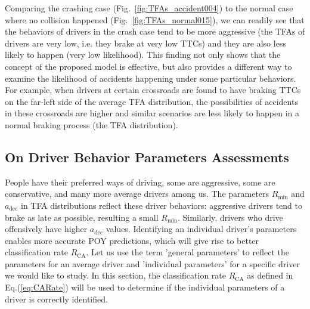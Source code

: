 Comparing the crashing case (Fig.~\ref{fig:TFAs_accident004}) to the normal case where no collision happened (Fig.~\ref{fig:TFAs_normal015}), we can readily see that the behaviors of drivers in the crash case tend to be more aggressive (the TFAs of drivers are very low, i.e. they brake at very low TTCs) and they are also less likely to happen (very low likelihood). This finding not only shows that the concept of the proposed model is effective, but also provides a different way to examine the likelihood of accidents happening under some particular behaviors. For example, when drivers at certain crossroads are found to have braking TTCs on the far-left side of the average TFA distribution, the possibilities of accidents in these crossroads are higher and similar scenarios are less likely to happen in a normal braking process (the TFA distribution).



\subsection{On Driver Behavior Parameters Assessments}
\label{subsec:CharaParam}

People have their preferred ways of driving, some are aggressive, some are conservative, and many more average drivers among us. The parameters $R_{\mathrm{min}}$ and $a_{\mathrm{dec}}$ in TFA distributions reflect these driver behaviors: aggressive drivers tend to brake as late as possible, resulting a small $R_{\mathrm{min}}$. Similarly, drivers who drive offensively have higher $a_{\mathrm{dec}}$ values. Identifying an individual driver's parameters enables more accurate POY predictions, which will give rise to better classification rate $R_{\mathrm{CA}}$. Let us use the term 'general parameters' to reflect the parameters for an average driver and 'individual parameters' for a specific driver we would like to study.  In this section, the classification rate $R_{\mathrm{CA}}$ as defined in Eq.(\ref{eq:CARate}) will be used to determine if the individual parameters of a driver is correctly identified. 



